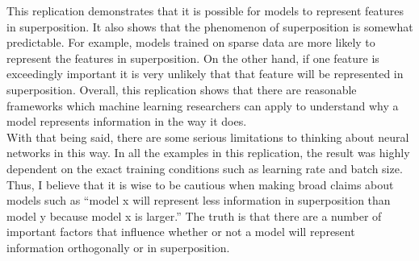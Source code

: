 \documentclass{article} %
\begin{document}
This replication demonstrates that it is possible for models to represent 
features in superposition. It also shows that the phenomenon of superposition is 
somewhat predictable. For example, models trained on sparse data are more
likely to represent the features in superposition. On the other
hand, if one feature is exceedingly important it is very unlikely that that
feature will be represented in superposition. Overall, this replication shows
that there are reasonable frameworks which machine learning researchers can
apply to understand why a model represents information in the way
it does.\\

With that being said, there are some serious limitations to thinking about neural 
networks in this way. In all the examples in this replication, the result was 
highly dependent on the exact training conditions such as learning rate and 
batch size. Thus, I believe that it is wise to be cautious when making broad 
claims about models such as ``model x will represent less information in 
superposition than model y because model x is larger.'' The truth is that there 
are a number of important factors that influence whether or not a model will
represent information orthogonally or in superposition.



\end{document}
